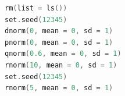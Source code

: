 \begin{lstlisting}[language=c++,label={code:17_01},caption={乱数のコードの例}]
rm(list = ls())
set.seed(12345)
dnorm(0, mean = 0, sd = 1)
pnorm(0, mean = 0, sd = 1)
qnorm(0.6, mean = 0, sd = 1)
rnorm(10, mean = 0, sd = 1)
set.seed(12345)
rnorm(5, mean = 0, sd = 1)
\end{lstlisting}
